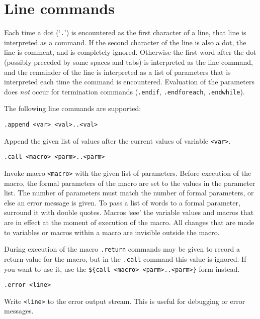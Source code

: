 \section{Line commands}
Each time a dot (`{\tt .}') is encountered as the first character of a line,
that line is interpreted as a
{\tt {\Tm}} command.
If the second character of the line is also a dot,
the line is comment, and is completely ignored.
Otherwise the first word after the dot
(possibly preceded by some spaces and tabs)
is interpreted as the line command,
and the remainder of the line is interpreted as a list of parameters
that is interpreted each time the command is encountered.
Evaluation of the parameters does {\em not} \/occur for termination commands
({\tt .endif}, {\tt .endforeach}, {\tt .endwhile}).
\par
The following line commands are supported:
\begin{verbatim}
.append <var> <val>..<val>
\end{verbatim}
\begin{desc}
Append the given list of values after the current values of variable
{\tt <var>}.
\end{desc}
\begin{verbatim}
.call <macro> <parm>..<parm>
\end{verbatim}
\begin{desc}
Invoke macro \verb+<macro>+ with the given list of parameters.
Before execution of the macro, the formal parameters of the macro
are set to the values in the parameter list.
The number of parameters must match the number of formal parameters,
or else an error message is given.
To pass a list of words to a formal parameter,
surround it with double quotes.
Macros `see' the variable values and macros that are in effect at the moment
of execution of the macro.
All changes that are made to variables or macros within a macro
are invisible outside the macro.
\par
During execution of the macro \verb+.return+ commands may be given
to record a return value for the macro, but in the \verb+.call+ command
this value is ignored.
If you want to use it,
use the \verb+${call <macro> <parm>..<parm>}+ form instead.
\end{desc}
\begin{verbatim}
.error <line>
\end{verbatim}
\begin{desc}
Write {\tt <line>} to the error output stream.
This is useful for debugging or error messages.
\end{desc}

